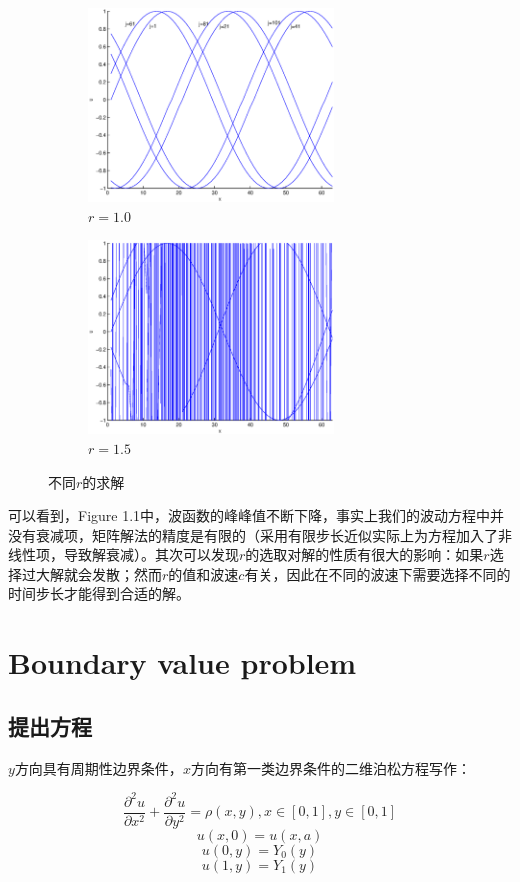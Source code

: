 \documentclass[paper=a4, fontsize=11pt]{scrartcl} %
\numberwithin{equation}{section} %
\numberwithin{figure}{section} %
\numberwithin{table}{section} %
\begin{document}
\begin{CJK*}{UTF8}{gbsn}
\begin{figure}[H]
\centering
\begin{subfigure}{70mm}
  \centering
  \includegraphics[width=65mm]{figure1-2.eps}
  \caption{$r=1.0$}
  \label{fig:sub1}
\end{subfigure}
\begin{subfigure}{70mm}
  \centering
  \includegraphics[width=65mm]{figure1-3.eps}
  \caption{$r=1.5$}
  \label{fig:sub2}
\end{subfigure}
\caption{不同$r$的求解}
\label{fig:test}
\end{figure}


可以看到，Figure 1.1中，波函数的峰峰值不断下降，事实上我们的波动方程中并没有衰减项，矩阵解法的精度是有限的（采用有限步长近似实际上为方程加入了非线性项，导致解衰减）。其次可以发现$r$的选取对解的性质有很大的影响：如果$r$选择过大解就会发散；然而$r$的值和波速$c$有关，因此在不同的波速下需要选择不同的时间步长才能得到合适的解。

\pagebreak
\section{Boundary value problem}
\subsection{提出方程}
$y$方向具有周期性边界条件，$x$方向有第一类边界条件的二维泊松方程写作：

\begin{equation}
\frac{\partial^2 u}{\partial x^2}+\frac{\partial^2 u}{\partial y^2}=\rho(x,y) ,x\in[0, 1], y\in[0, 1] 
\end{equation}
\begin{equation}
u(x, 0) = u(x, a)
\end{equation}
\begin{equation}
u(0,y) = Y_0(y)
\end{equation}
\begin{equation}
u(1,y) = Y_1(y)
\end{equation}


\end{CJK*}
\end{document}
